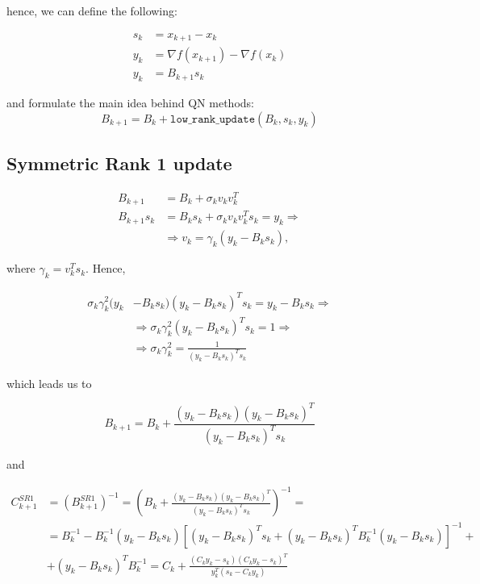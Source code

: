 hence, we can define the following:

\begin{equation*}
    \begin{aligned}
        s_k &= x_{k+1} - x_k \\ 
        y_k &= \nabla f(x_{k+1}) - \nabla f(x_k) \\ 
        y_k &= B_{k+1} s_k 
    \end{aligned}
\end{equation*}

and formulate the main idea behind QN methods: $$B_{k+1} = B_k + \texttt{low\_rank\_update}(B_k, s_k, y_k)$$

\subsection{Symmetric Rank 1 update}

\begin{equation*}
    \begin{aligned}
        B_{k+1} &= B_k + \sigma_k v_k v_k^T \\ 
        B_{k+1} s_k &= B_k s_k + \sigma_k v_k v_k^T s_k = y_k \Rightarrow \\ 
        &\Rightarrow v_k = \gamma_k (y_k - B_k s_k),
    \end{aligned}
\end{equation*}

where $\gamma_k = v_k^T s_k$. Hence, 

\begin{equation*}
    \begin{aligned}
        \sigma_k \gamma_k^2 (y_k &- B_k s_k) (y_k - B_k s_k)^T s_k = y_k - B_k s_k \Rightarrow \\
        &\Rightarrow \sigma_k \gamma_k^2 (y_k - B_k s_k)^T s_k = 1 \Rightarrow \\ 
        &\Rightarrow \sigma_k \gamma_k^2 = \frac{1}{(y_k - B_k s_k)^T s_k}
    \end{aligned}
\end{equation*}

which leads us to 

\begin{equation*}
    \boxed{B_{k+1} = B_k + \frac{(y_k - B_k s_k)(y_k - B_k s_k)^T}{(y_k - B_k s_k)^T s_k}}
\end{equation*}

and

\begin{equation*}
    \begin{aligned}
        C_{k+1}^{SR1} &= \left( B_{k+1}^{SR1} \right)^{-1} = \left( B_k + \frac{(y_k - B_k s_k)(y_k - B_k s_k)^T}{(y_k - B_k s_k)^T s_k} \right)^{-1} = \\ 
        &= B_k^{-1} - B_{k}^{-1}(y_k - B_k s_k) \left[(y_k - B_k s_k)^T s_k + (y_k - B_k s_k)^T B_k^{-1} (y_k - B_k s_k)\right]^{-1} + \\ 
        &+ (y_k - B_k s_k)^T B_k^{-1} = C_k + \frac{(C_k y_k - s_k)(C_k y_k - s_k)^T}{y_k^T (s_k - C_k y_k)}
    \end{aligned}
\end{equation*}

